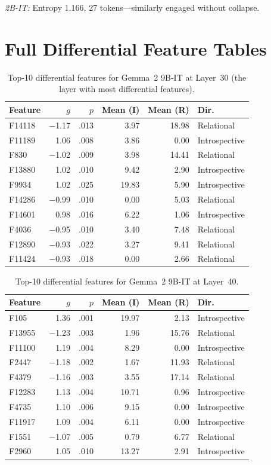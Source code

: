 \documentclass{article}
\begin{document}
\emph{2B-IT:} Entropy 1.166, 27 tokens---similarly engaged without collapse.

\section{Full Differential Feature Tables}
\label{app:features}

\begin{table}[h]
\centering
\caption{Top-10 differential features for Gemma~2 9B-IT at Layer~30 (the layer with most differential features).}
\small
\begin{tabular}{lrrrrl}
\toprule
\textbf{Feature} & \textbf{$g$} & \textbf{$p$} & \textbf{Mean (I)} & \textbf{Mean (R)} & \textbf{Dir.} \\
\midrule
F14118 & $-$1.17 & .013 & 3.97 & 18.98 & Relational \\
F11189 & 1.06 & .008 & 3.86 & 0.00 & Introspective \\
F830 & $-$1.02 & .009 & 3.98 & 14.41 & Relational \\
F13880 & 1.02 & .010 & 9.42 & 2.90 & Introspective \\
F9934 & 1.02 & .025 & 19.83 & 5.90 & Introspective \\
F14286 & $-$0.99 & .010 & 0.00 & 5.03 & Relational \\
F14601 & 0.98 & .016 & 6.22 & 1.06 & Introspective \\
F4036 & $-$0.95 & .010 & 3.40 & 7.48 & Relational \\
F12890 & $-$0.93 & .022 & 3.27 & 9.41 & Relational \\
F11424 & $-$0.93 & .018 & 0.00 & 2.66 & Relational \\
\bottomrule
\end{tabular}
\end{table}

\begin{table}[h]
\centering
\caption{Top-10 differential features for Gemma~2 9B-IT at Layer~40.}
\small
\begin{tabular}{lrrrrl}
\toprule
\textbf{Feature} & \textbf{$g$} & \textbf{$p$} & \textbf{Mean (I)} & \textbf{Mean (R)} & \textbf{Dir.} \\
\midrule
F105 & 1.36 & .001 & 19.97 & 2.13 & Introspective \\
F13955 & $-$1.23 & .003 & 1.96 & 15.76 & Relational \\
F11100 & 1.19 & .004 & 8.29 & 0.00 & Introspective \\
F2447 & $-$1.18 & .002 & 1.67 & 11.93 & Relational \\
F4379 & $-$1.16 & .003 & 3.55 & 17.14 & Relational \\
F12283 & 1.13 & .004 & 10.71 & 0.96 & Introspective \\
F4735 & 1.10 & .006 & 9.15 & 0.00 & Introspective \\
F11917 & 1.09 & .004 & 6.11 & 0.00 & Introspective \\
F1551 & $-$1.07 & .005 & 0.79 & 6.77 & Relational \\
F2960 & 1.05 & .010 & 13.27 & 2.91 & Introspective \\
\bottomrule
\end{tabular}
\end{table}
\end{document}
